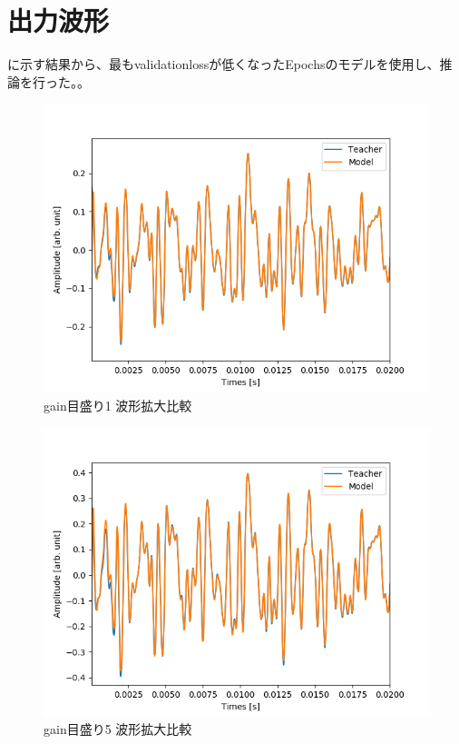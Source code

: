 \documentclass{jreport}		%
\begin{document}
\clearpage
\section{出力波形}
に示す結果から、最もvalidationlossが低くなったEpochsのモデルを使用し、推論を行った。。

\begin{figure}[htbp]
 \begin{center}
  \includegraphics[width=150mm]{gain1_output_hikaku.png}
 \end{center}
 \caption{gain目盛り1 波形拡大比較}
 \label{fig:one}
\end{figure}

\begin{figure}[htbp]
 \begin{center}
  \includegraphics[width=150mm]{gain5_output_hikaku.png}
 \end{center}
 \caption{gain目盛り5 波形拡大比較}
 \label{fig:one}
\end{figure}
\end{document}

